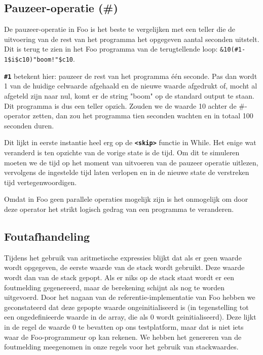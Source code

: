 \documentclass[11pt]{article}
\begin{document}
\subsection{Pauzeer-operatie (\#)}
De pauzeer-operatie in Foo is het beste te vergelijken met een teller die de uitvoering van de rest van het programma het opgegeven aantal seconden uitstelt. 
Dit is terug te zien in het Foo programma van de terugtellende loop: \verb|&10(#1-1$i$c10)"boom!"$c10|.

{\bf \verb|#1|} betekent hier: pauzeer de rest van het programma \'e\'en seconde. 
Pas dan wordt 1 van de huidige celwaarde afgehaald en de nieuwe waarde afgedrukt of, mocht al afgeteld zijn naar nul, komt er de string "boom" op de standard output te staan.
Dit programma is dus een teller opzich.
Zouden we de waarde 10 achter de \#-operator zetten, dan zou het programma tien seconden wachten en in totaal 100 seconden duren.


Dit lijkt in eerste instantie heel erg op de {\bf\verb|<skip>|} functie in While.
Het enige wat veranderd is ten opzichte van de vorige state is de tijd.
Om dit te simuleren moeten we de tijd op het moment van uitvoeren van de pauzeer operatie uitlezen, vervolgens de ingestelde tijd laten verlopen en in de nieuwe state de verstreken tijd vertegenwoordigen.

Omdat in Foo geen parallele operaties mogelijk zijn is het onmogelijk om door deze operator het strikt logisch gedrag van een programma te veranderen.

\subsection{Foutafhandeling} %

Tijdens het gebruik van aritmetische expressies blijkt dat als er geen waarde wordt opgegeven, de eerste waarde van de stack wordt gebruikt. 
Deze waarde wordt dan van de stack gepopt. 
Als er niks op de stack staat wordt er een foutmelding gegenereerd, maar de berekening schijnt als nog te worden uitgevoerd.
Door het nagaan van de referentie-implementatie van Foo hebben we geconstateerd dat deze gepopte waarde ongeinitialiseerd is (in tegenstelling tot een ongedefinieerde waarde in de array, die als 0 wordt geinitialiseerd).
Deze lijkt in de regel de waarde 0 te bevatten op ons testplatform, maar dat is niet iets waar de Foo-programmeur op kan rekenen.
We hebben het genereren van de foutmelding meegenomen in onze regels voor het gebruik van stackwaardes.
\end{document}
